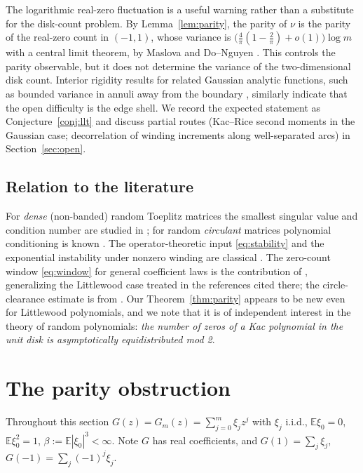 \documentclass[11pt]{article}
\newcommand{\E}{\mathbb{E}}
\begin{document}
The logarithmic real-zero fluctuation is a useful warning rather than a substitute
for the disk-count problem.  By Lemma~\ref{lem:parity}, the parity of \(\nu\) is
the parity of the real-zero count in \((-1,1)\), whose variance is
$\bigl(\tfrac4\pi(1-\tfrac2\pi)+o(1)\bigr)\log m$ with a central limit theorem, by
Maslova \cite{Maslova} and Do--Nguyen \cite{DoNguyen}.  This controls the parity
observable, but it does not determine the variance of the two-dimensional disk
count.  Interior rigidity results for related Gaussian analytic functions, such
as bounded variance in annuli away from the boundary \cite{Yeager}, similarly
indicate that the open difficulty is the edge shell.  We record the expected
statement as Conjecture~\ref{conj:llt} and discuss partial routes (Kac--Rice
second moments in the Gaussian case; decorrelation of winding increments along
well-separated arcs) in Section~\ref{sec:open}.

\subsection*{Relation to the literature}

For \emph{dense} (non-banded) random Toeplitz matrices the smallest singular
value and condition number are studied in \cite{condrefs}; for random
\emph{circulant} matrices polynomial conditioning is known \cite{condrefs}.  The
operator-theoretic input \eqref{eq:stability} and the exponential instability
under nonzero winding are classical \cite{BG}.  The zero-count window
\eqref{eq:window} for general coefficient laws is the contribution of
\cite{Manrique}, generalizing the Littlewood case treated in the references
cited there; the circle-clearance estimate is from \cite{KMS}.  Our
Theorem~\ref{thm:parity} appears to be new even for Littlewood polynomials, and
we note that it is of independent interest in the theory of random polynomials:
\emph{the number of zeros of a Kac polynomial in the unit disk is asymptotically
equidistributed mod 2}.

\section{The parity obstruction}\label{sec:parity}

Throughout this section $G(z)=G_m(z)=\sum_{j=0}^m\xi_jz^j$ with
$\xi_j$ i.i.d., $\E\xi_0=0$, $\E\xi_0^2=1$, $\beta:=\E|\xi_0|^3<\infty$.  Note
$G$ has real coefficients, and $G(1)=\sum_j\xi_j$,
$G(-1)=\sum_j(-1)^j\xi_j$.
\end{document}
